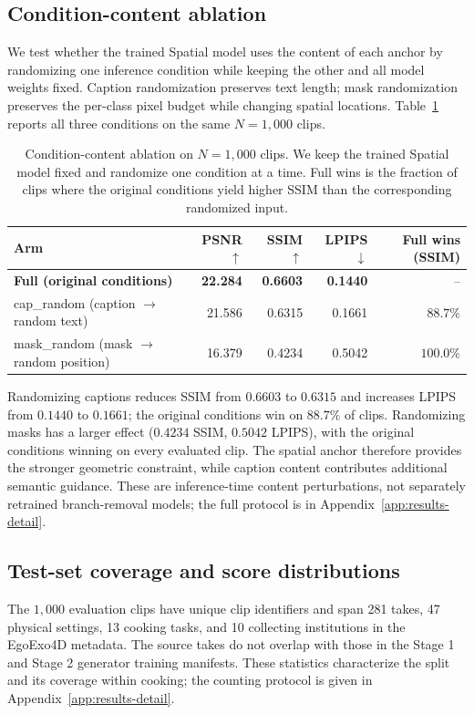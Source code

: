 \documentclass{article} %
\begin{document}
\subsection{Condition-content ablation}
\label{sec:component-ablation}

We test whether the trained Spatial model uses the content of each anchor
by randomizing one inference condition while keeping the other and all
model weights fixed. Caption randomization preserves text length; mask
randomization preserves the per-class pixel budget while changing spatial
locations. Table~\ref{tab:component-ablation} reports all three conditions
on the same $N{=}1{,}000$ clips.

\begin{table}[h]
\centering
\footnotesize
\captionsetup{font=footnotesize}
\caption{Condition-content ablation on $N{=}1{,}000$ clips. We keep the trained
Spatial model fixed and randomize one condition at a time. Full wins is the
fraction of clips where the original conditions yield higher SSIM than the
corresponding randomized input.}
\label{tab:component-ablation}
\begin{tabular}{lrrrr}
\toprule
Arm & PSNR $\uparrow$ & SSIM $\uparrow$ & LPIPS $\downarrow$ & Full wins (SSIM) \\
\midrule
\textbf{Full (original conditions)} & \textbf{22.284} & \textbf{0.6603} & \textbf{0.1440} & -- \\
cap\_random (caption $\to$ random text) & 21.586 & 0.6315 & 0.1661 & $88.7\%$ \\
mask\_random (mask $\to$ random position) & 16.379 & 0.4234 & 0.5042 & $100.0\%$ \\
\bottomrule
\end{tabular}
\end{table}

Randomizing captions reduces SSIM from $0.6603$ to $0.6315$ and increases
LPIPS from $0.1440$ to $0.1661$; the original conditions win on $88.7\%$
of clips. Randomizing masks has a larger effect ($0.4234$ SSIM,
$0.5042$ LPIPS), with the original conditions winning on every evaluated
clip. The spatial anchor therefore provides the stronger geometric
constraint, while caption content contributes additional semantic guidance.
These are inference-time content perturbations, not separately retrained
branch-removal models; the full protocol is in
Appendix~\ref{app:results-detail}.

\subsection{Test-set coverage and score distributions}
\label{sec:coverage-compute}
The $1{,}000$ evaluation clips have unique clip identifiers and span
281 takes, 47 physical settings, 13 cooking tasks, and 10 collecting
institutions in the EgoExo4D metadata. The source takes do not overlap
with those in the Stage 1 and Stage 2 generator training manifests.
These statistics characterize the split and its coverage within cooking;
the counting protocol is given in Appendix~\ref{app:results-detail}.
\end{document}
